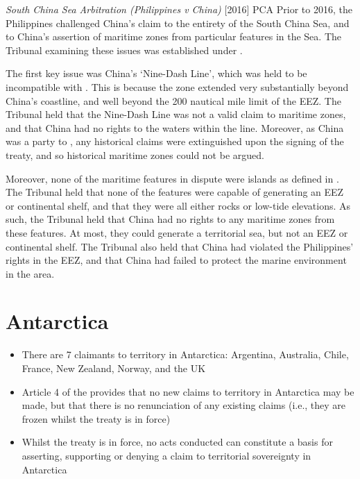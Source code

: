 \begin{casedetails}{\textit{South China Sea Arbitration (Philippines v China)} [2016] PCA}
    \flushleft
    Prior to 2016, the Philippines challenged China's claim to the entirety of the South China Sea, and to China's assertion of maritime zones from particular features in the Sea. The Tribunal examining these issues was established under .

    \vspace{\baselineskip}

    The first key issue was China's `Nine-Dash Line', which was held to be incompatible with . This is because the zone extended very substantially beyond China's coastline, and well beyond the 200 nautical mile limit of the EEZ. The Tribunal held that the Nine-Dash Line was not a valid claim to maritime zones, and that China had no rights to the waters within the line. Moreover, as China was a party to , any historical claims were extinguished upon the signing of the treaty, and so historical maritime zones could not be argued.

    \vspace{\baselineskip}

    Moreover, none of the maritime features in dispute were islands as defined in . The Tribunal held that none of the features were capable of generating an EEZ or continental shelf, and that they were all either rocks or low-tide elevations. As such, the Tribunal held that China had no rights to any maritime zones from these features. At most, they could generate a territorial sea, but not an EEZ or continental shelf. The Tribunal also held that China had violated the Philippines' rights in the EEZ, and that China had failed to protect the marine environment in the area.
\end{casedetails}

\section{Antarctica}
\begin{itemize}
    \item There are 7 claimants to territory in Antarctica: Argentina, Australia, Chile, France, New Zealand, Norway, and the UK
    \item Article 4 of the  provides that no new claims to territory in Antarctica may be made, but that there is no renunciation of any existing claims (i.e., they are frozen whilst the treaty is in force)
    \item Whilst the treaty is in force, no acts conducted can constitute a basis for asserting, supporting or denying a claim to territorial sovereignty in Antarctica
\end{itemize}

